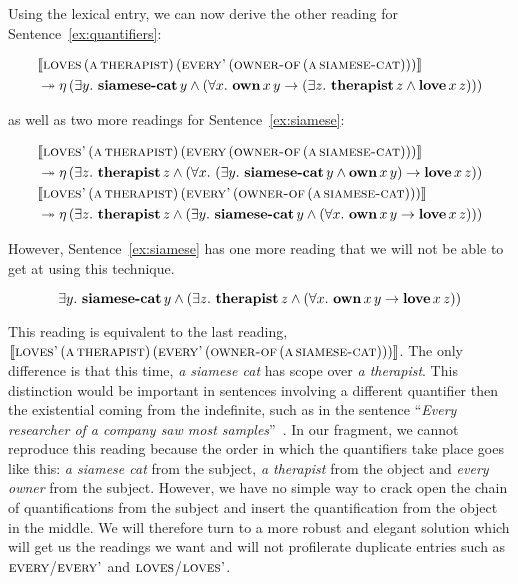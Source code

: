 Using the lexical entry, we can now derive the other reading for
Sentence~\ref{ex:quantifiers}:

\addtocounter{equation}{-2}
\NoChapterPrefix
\begin{align}
& \llbracket \textsc{loves}\,(\textsc{a}\,\textsc{therapist})\,(\textsc{every'}\,(\textsc{owner-of}\,(\textsc{a}\,\textsc{siamese-cat}))) \rrbracket \nonumber \\
&\twoheadrightarrow \eta\,(\exists y.\ \textbf{siamese-cat}\,y \land (\forall x.\ \textbf{own}\,x\,y \to (\exists z.\ \textbf{therapist}\,z \land \textbf{love}\,x\,z)))
\end{align}
\ChapterPrefix
\addtocounter{equation}{1}

as well as two more readings for Sentence~\ref{ex:siamese}:

\addtocounter{equation}{-1}
\NoChapterPrefix
\begin{align}
& \sem{\app{\abs{loves'}}{(\ap{\abs{a}}{\abs{therapist}})}{(\ap{\abs{every}}{(\ap{\abs{owner-of}}{(\ap{\abs{a}}{\abs{siamese-cat}})})})}} \nonumber \\
&\tto \etaE{(\exists z.\ \ap{\obj{therapist}}{z} \land (\forall x.\ (\exists y.\ \ap{\obj{siamese-cat}}{y} \land \app{\obj{own}}{x}{y}) \to \app{\obj{love}}{x}{z}))} \\
\addtocounter{equation}{-1}
& \sem{\app{\abs{loves'}}{(\ap{\abs{a}}{\abs{therapist}})}{(\ap{\abs{every'}}{(\ap{\abs{owner-of}}{(\ap{\abs{a}}{\abs{siamese-cat}})})})}} \nonumber \\
&\tto \etaE{(\exists z.\ \ap{\obj{therapist}}{z} \land (\exists y.\ \ap{\obj{siamese-cat}}{y} \land (\forall x.\ \app{\obj{own}}{x}{y} \to \app{\obj{love}}{x}{z})))}
\end{align}
\ChapterPrefix

However, Sentence~\ref{ex:siamese} has one more reading that we will not be
able to get at using this technique.

$$
\exists y.\ \ap{\obj{siamese-cat}}{y} \land (\exists z.\ \ap{\obj{therapist}}{z} \land (\forall x.\ \app{\obj{own}}{x}{y} \to \app{\obj{love}}{x}{z}))
$$

This reading is equivalent to the last reading,
$\llbracket \textsc{loves'}\,(\textsc{a}\,\textsc{therapist})\,(\textsc{every'}\,(\textsc{owner-of}\,(\textsc{a}\,\textsc{siamese-cat}))) \rrbracket$. The
only difference is that this time, \emph{a siamese cat} has scope over
\emph{a therapist}. This distinction would be important in sentences
involving a different quantifier then the existential coming from the
indefinite, such as in the sentence ``\emph{Every researcher of a company
  saw most samples}''~\cite{burchardt2004computational}. In our fragment,
we cannot reproduce this reading because the order in which the quantifiers
take place goes like this: \emph{a siamese cat} from the subject, \emph{a
  therapist} from the object and \emph{every owner} from the
subject. However, we have no simple way to crack open the chain of
quantifications from the subject and insert the quantification from the
object in the middle. We will therefore turn to a more robust and elegant
solution which will get us the readings we want and will not profilerate
duplicate entries such as $\textsc{every}$/$\textsc{every'}$ and
$\textsc{loves}$/$\textsc{loves'}$.


